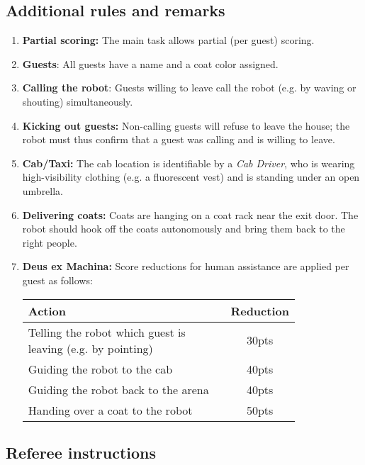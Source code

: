 \subsection*{Additional rules and remarks}
\begin{enumerate}[nosep]
	\item \textbf{Partial scoring:} The main task allows partial (per guest) scoring.

	\item \textbf{Guests}: All guests have a name and a coat color assigned.

	\item \textbf{Calling the robot}: Guests willing to leave call the robot (e.g. by waving or shouting) simultaneously.

	\item \textbf{Kicking out guests:} Non-calling guests will refuse to leave the house; the robot must thus confirm that a guest was calling and is willing to leave.

	\item \textbf{Cab/Taxi:} The cab location is identifiable by a \emph{Cab Driver}, who is wearing high-visibility clothing (e.g. a fluorescent vest) and is standing under an open umbrella.

	\item \textbf{Delivering coats:} Coats are hanging on a coat rack near the exit door.
	The robot should hook off the coats autonomously and bring them back to the right people.

	\item \textbf{Deus ex Machina:} Score reductions for human assistance are applied per guest as follows:
	\begin{table}[h]
		\begin{tabular}{m{0.8\linewidth} c}
			\textbf{Action} & \textbf{Reduction} \\\hline
			Telling the robot which guest is leaving (e.g. by pointing) & 30pts \\
			Guiding the robot to the cab & 40pts \\
			Guiding the robot back to the arena & 40pts \\
			Handing over a coat to the robot & 50pts \\\hline
		\end{tabular}
	\end{table}
\end{enumerate}


\subsection*{Referee instructions}

